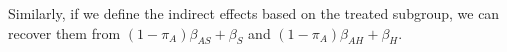 \documentclass{article}
\newcommand{\indicator}{\mathbbm{1}}
\begin{document}
Similarly, if we define the indirect effects based on the treated subgroup, we can recover them from $(1-\pi_A) \beta_{AS} + \beta_{S}$ and $(1-\pi_A) \beta_{AH} + \beta_{H}$.

      
\end{document}
